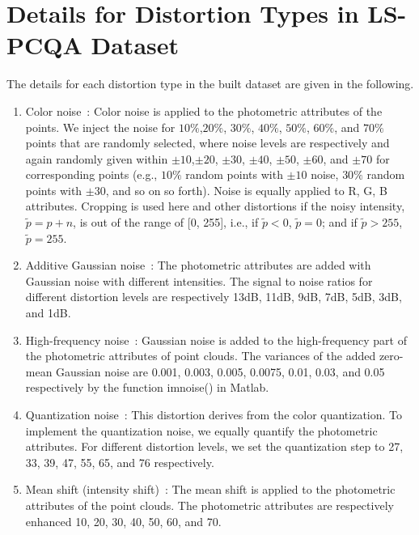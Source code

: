 \documentclass[acmsmall]{acmart}
\begin{document}



\appendix

\section{Details for Distortion Types in LS-PCQA Dataset}\label{sec:distortiondetails}

\par The details for each distortion type in the built dataset are given in the following.

\begin{enumerate}
\item {\sf Color noise~\cite{Ponomarenko2015TID2013,Yang2020TMM3DTO2D}}: Color noise is applied to the photometric attributes of the points. We inject the noise for  $10\%$,$20\%$, $30\%$, $40\%$, $50\%$, $60\%$, and $70\%$ points that are randomly selected, where noise levels are respectively and again randomly given within  $\pm10$,$\pm20$, $\pm30$, $\pm40$, $\pm50$, $\pm60$, and $\pm70$ for corresponding points (e.g., $10\%$ random points with $\pm10$ noise,  $30\%$ random points with $\pm30$, and so on so forth). Noise is equally applied to R, G, B attributes. Cropping is used here and other distortions if the noisy intensity, $\tilde{p} = p + n $, is out of the range of [0, 255], i.e., if $\tilde{p} < 0$, $\tilde{p} = 0$; and if $\tilde{p} > 255$, $\tilde{p} = 255$.
  \item {\sf Additive Gaussian noise~\cite{Boyat2015ImageNoise,Ponomarenko2015TID2013,Yang2020TMM3DTO2D}}: The photometric attributes are added with Gaussian noise with different intensities. The signal to noise ratios for different distortion levels are respectively 13dB, 11dB, 9dB, 7dB, 5dB, 3dB, and 1dB.
  \item {\sf High-frequency noise~\cite{Ponomarenko2015TID2013}}: Gaussian noise is added to the high-frequency part of the photometric attributes of point clouds. The variances of the added zero-mean Gaussian noise are 0.001, 0.003, 0.005, 0.0075, 0.01, 0.03, and 0.05 respectively by the function imnoise() in Matlab.
  \item {\sf Quantization noise~\cite{Boyat2015ImageNoise,Ponomarenko2015TID2013}}: This distortion derives from the color quantization. To implement the quantization noise, we equally quantify the photometric attributes. For different distortion levels, we set the quantization step to 27, 33, 39, 47, 55, 65, and 76 respectively.
  \item {\sf Mean shift (intensity shift)~\cite{Ponomarenko2015TID2013}}: The mean shift is applied to the photometric attributes of the point clouds. The photometric attributes are respectively enhanced 10, 20, 30, 40, 50, 60, and 70.

\end{enumerate}
\end{document}
